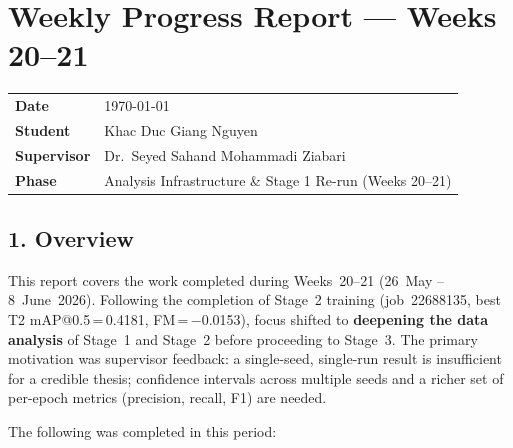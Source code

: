 
\section*{Weekly Progress Report — Weeks 20--21}

\begin{tabular}{ll}
    \textbf{Date}       & \today \\
    \textbf{Student}    & Khac Duc Giang Nguyen \\
    \textbf{Supervisor} & Dr.\ Seyed Sahand Mohammadi Ziabari \\
    \textbf{Phase}      & Analysis Infrastructure \& Stage 1 Re-run (Weeks 20--21) \\
\end{tabular}

\vspace{1em}

\subsection*{1. Overview}

This report covers the work completed during Weeks~20--21
(26~May -- 8~June~2026).
Following the completion of Stage~2 training (job~22688135,
best T2 mAP@0.5\,=\,0.4181, FM\,=\,$-$0.0153), focus shifted to
\textbf{deepening the data analysis} of Stage~1 and Stage~2
before proceeding to Stage~3. The primary motivation was
supervisor feedback: a single-seed, single-run result is
insufficient for a credible thesis; confidence intervals across
multiple seeds and a richer set of per-epoch metrics
(precision, recall, F1) are needed.

The following was completed in this period:

